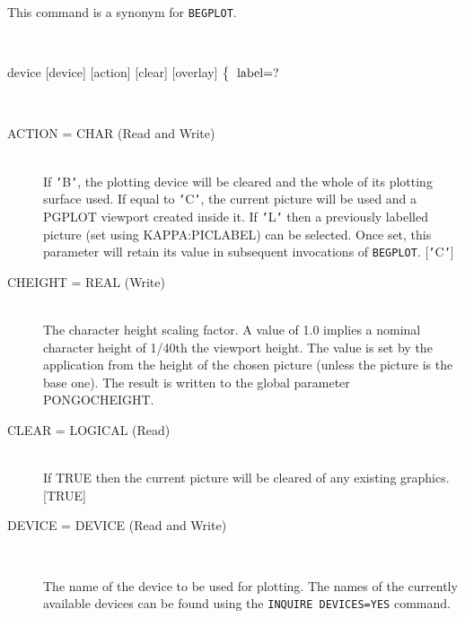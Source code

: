 \documentclass[twoside,11pt]{article}
\newcommand{\htmlref}[2]{#1}
\renewcommand{\_}{\texttt{\symbol{95}}}
\newcommand{\cnam}[1]{{\tt #1}}
\newcommand{\iref} [1]{\htmlref{#1}{#1}}
\newcommand{\sstusage}[1]{\item[Usage:] \mbox{}
\\[1.3ex]{\raggedright \ssttt #1}}
\newcommand{\sstparameters}[1]{
   \item[Parameters:] \mbox{} \\
   \vspace{-3.5ex}
   \begin{description}
      #1
   \end{description}
}
\newcommand{\sstsubsection}[1]{ \item[{#1}] \mbox{} \\}
\newcommand{\sstusage}[1]{\item[Usage:]
      \begin{description}
         {\ssttt #1}
      \end{description}
      \\
   }
\newcommand{\sstparameters}[1]{
      \item[Parameters:] \\
      \begin{description}
         #1
      \end{description}
      \\
   }
\newcommand{\sstsubsection}[1]{\item[{#1}]}
\begin{document}
{{      This command is a synonym for \cnam{\iref{BEGPLOT}}.
   }
   \sstusage {
      device [device] [action] [clear] [overlay]
        \newline\hspace*{1.5em}
        $\left\{ {\begin{tabular}{l}
                                      label=? \\
                  \end{tabular} }
        \right.$
        \newline\hspace*{1.9em}
        \makebox[0mm][c]{\small action}
   }
   \sstparameters{
      \sstsubsection{
         ACTION = \_CHAR (Read and Write)
      }{
         If {\tt '}B{\tt '}, the plotting device will be cleared and the whole of
         its plotting surface used. If equal to {\tt '}C{\tt '}, the current picture
         will be used and a PGPLOT viewport created inside it. If {\tt '}L{\tt '}
         then a previously labelled picture (set using KAPPA:PICLABEL)
         can be selected. Once set, this parameter will retain its value
         in subsequent invocations of \cnam{\iref{BEGPLOT}}.
         [{\tt '}C{\tt '}]
      }
      \sstsubsection{
         CHEIGHT = \_REAL (Write)
      }{
         The character height scaling factor. A value of 1.0 implies a
         nominal character height of 1/40th the viewport height. The
         value is set by the application from the height of the chosen
         picture (unless the picture is the base one). The result is
         written to the global parameter PONGO\_CHEIGHT.
      }
      \sstsubsection{
         CLEAR = \_LOGICAL (Read)
      }{
         If TRUE then the current picture will be cleared of any
         existing graphics.
         [TRUE]
      }
      \sstsubsection{
         DEVICE = DEVICE (Read and Write)
      }{
         The name of the device to be used for plotting.  The names of
         the currently available devices can be found using the
         \cnam{\iref{INQUIRE} DEVICES=YES} command.

}}}
\end{document}
